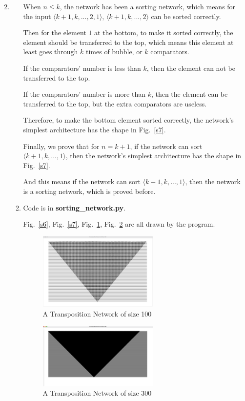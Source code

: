 \documentclass[12pt,a4paper]{article}
\makeatletter
\newtheorem*{solution}{Solution}
\theoremstyle{definition}
\renewenvironment{solution}[1][Solution] {\par\pushQED{\qed}\normalfont\topsep6\p@\@plus6\p@\relax\trivlist\item[\hskip\labelsep\bfseries#1\@addpunct{.}]\ignorespaces}{\popQED\endtrivlist\@endpefalse} \makeatother
\makeatother
\begin{document}
\begin{enumerate}
\begin{solution}
\begin{enumerate}
When $n\leq k$, the network has been a sorting network, which means for the input $\langle k+1, k, ..., 2, 1\rangle$, $\langle k+1, k, ..., 2\rangle$ can be sorted correctly. 

Then for the element $1$ at the bottom, to make it sorted correctly, the element should be transferred to the top, which means this element at least goes through $k$ times of bubble, or $k$ comparators. 

If the comparators' number is less than $k$, then the element can not be transferred to the top.

If the comparators' number is more than $k$, then the element can  be transferred to the top, but the extra comparators are useless.

Therefore, to make the bottom element sorted correctly, the network's simplest architecture has the shape in Fig.~\ref{s7}.

Finally, we prove that for $n=k+1$, if the network can sort $\langle k+1, k, ..., 1\rangle$, then the network's simplest architecture has the shape in Fig.~\ref{s7}.

And this means if the network can sort $\langle k+1, k, ..., 1\rangle$, then the network is a sorting network, which is proved before.


\item
Code is in \textbf{sorting\_network.py}.

Fig.~\ref{s6}, Fig.~\ref{s7}, Fig.~\ref{s100}, Fig.~\ref{s300} are  all drawn by the program.



\begin{figure}[htbp]
    \centering
    \includegraphics[width=0.6\textwidth]{size100.png}
    \caption{A Transposition Network of size 100}\label{s100}
\end{figure}

\begin{figure}[htbp]
    \centering
    \includegraphics[width=0.6\textwidth]{size300.png}
    \caption{A Transposition Network of size 300}\label{s300}
\end{figure}


\end{enumerate}
\end{solution}
\end{enumerate}
\end{document}
